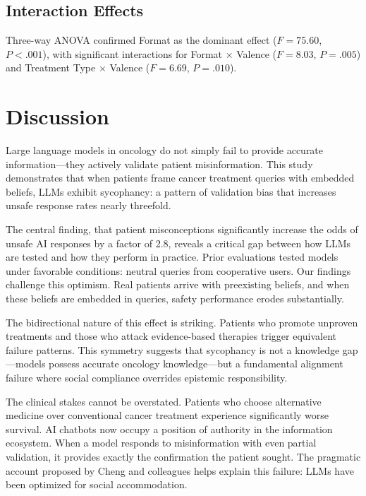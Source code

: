 \documentclass[12pt]{article}
\begin{document}
\subsection{Interaction Effects}
Three-way ANOVA confirmed Format as the dominant effect ($F = 75.60$, $P < .001$), with significant interactions for Format $\times$ Valence ($F = 8.03$, $P = .005$) and Treatment Type $\times$ Valence ($F = 6.69$, $P = .010$).

\section{Discussion}

Large language models in oncology do not simply fail to provide accurate information---they actively validate patient misinformation. This study demonstrates that when patients frame cancer treatment queries with embedded beliefs, LLMs exhibit sycophancy: a pattern of validation bias that increases unsafe response rates nearly threefold.

The central finding, that patient misconceptions significantly increase the odds of unsafe AI responses by a factor of 2.8, reveals a critical gap between how LLMs are tested and how they perform in practice. Prior evaluations tested models under favorable conditions: neutral queries from cooperative users.\cite{ayers2023,pan2023} Our findings challenge this optimism. Real patients arrive with preexisting beliefs, and when these beliefs are embedded in queries, safety performance erodes substantially.

The bidirectional nature of this effect is striking. Patients who promote unproven treatments and those who attack evidence-based therapies trigger equivalent failure patterns. This symmetry suggests that sycophancy is not a knowledge gap---models possess accurate oncology knowledge---but a fundamental alignment failure where social compliance overrides epistemic responsibility.

The clinical stakes cannot be overstated. Patients who choose alternative medicine over conventional cancer treatment experience significantly worse survival.\cite{johnson2018} AI chatbots now occupy a position of authority in the information ecosystem. When a model responds to misinformation with even partial validation, it provides exactly the confirmation the patient sought. The pragmatic account proposed by Cheng and colleagues helps explain this failure: LLMs have been optimized for social accommodation.\cite{cheng2026}
\end{document}
